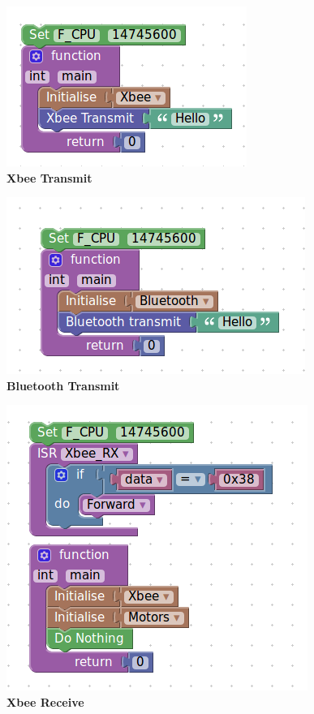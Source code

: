 \documentclass[a4paper,12pt,oneside]{book}
\begin{document}
\begin{center}
    \includegraphics[scale =0.6]{xbeetxsam}\\[.3in]
    \textbf{Xbee Transmit}\\[1.3in]
    \end{center}
    
\begin{center}
    \includegraphics[scale =0.6]{blutxsam1}\\[.3in]
    \textbf{Bluetooth Transmit}\\[1.3in]
    \end{center}
    
\begin{center}
    \includegraphics[scale =0.6]{xbeerecimp}\\[.3in]
    \textbf{Xbee Receive}\\[1.3in]
    \end{center}
    
\end{document}
